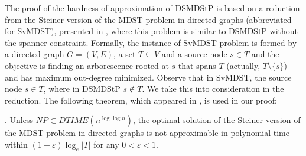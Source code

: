  

The proof of the hardness of approximation of \mbox{DSMDStP} is based on a reduction from the Steiner version of the MDST problem in directed graphs (abbreviated for SvMDST), 
presented in \cite{Fraigniaud2001}, where this problem is similar to DSMDStP without the spanner constraint. Formally, the instance of SvMDST problem is formed by a 
directed graph $G = (V,E)$, a set $T \subseteq V$ and a source node $s \in T$ and the objective is finding an arborescence rooted at $s$ that spans $T$ (actually, $T \setminus \lbrace s \rbrace$) 
and has maximum out-degree minimized. Observe that in SvMDST, the source node $s \in T$, where in DSMDStP $s \notin T$. We take this into consideration 
in the reduction. The following theorem, which appeared in \cite{Fraigniaud2001}, is used in our proof:

\begin{Theo}
  \label{teorema:steiner_mdst}
  \cite{Fraigniaud2001}. Unless $NP \subset DTIME(n^{\log \log{n}})$, the optimal solution of the Steiner version of the MDST problem in directed graphs 
is not approximable in polynomial time within $(1-\varepsilon)\log_e |T|$ for any $0 < \varepsilon < 1$.
\end{Theo}

